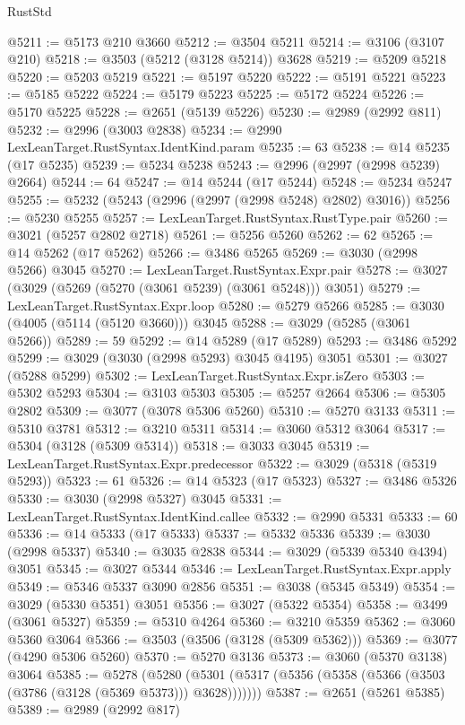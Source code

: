 \begin{lexlean}{RustStd}
\begin{coremodule}
@5211 := @5173 @210 @3660
@5212 := @3504 @5211
@5214 := @3106 (@3107 @210)
@5218 := @3503 (@5212 (@3128 @5214)) @3628
@5219 := @5209 @5218
@5220 := @5203 @5219
@5221 := @5197 @5220
@5222 := @5191 @5221
@5223 := @5185 @5222
@5224 := @5179 @5223
@5225 := @5172 @5224
@5226 := @5170 @5225
@5228 := @2651 (@5139 @5226)
@5230 := @2989 (@2992 @811)
@5232 := @2996 (@3003 @2838)
@5234 := @2990 LexLeanTarget.RustSyntax.IdentKind.param
@5235 := 63
@5238 := @14 @5235 (@17 @5235)
@5239 := @5234 @5238
@5243 := @2996 (@2997 (@2998 @5239) @2664)
@5244 := 64
@5247 := @14 @5244 (@17 @5244)
@5248 := @5234 @5247
@5255 := @5232 (@5243 (@2996 (@2997 (@2998 @5248) @2802) @3016))
@5256 := @5230 @5255
@5257 := LexLeanTarget.RustSyntax.RustType.pair
@5260 := @3021 (@5257 @2802 @2718)
@5261 := @5256 @5260
@5262 := 62
@5265 := @14 @5262 (@17 @5262)
@5266 := @3486 @5265
@5269 := @3030 (@2998 @5266) @3045
@5270 := LexLeanTarget.RustSyntax.Expr.pair
@5278 := @3027 (@3029 (@5269 (@5270 (@3061 @5239) (@3061 @5248))) @3051)
@5279 := LexLeanTarget.RustSyntax.Expr.loop
@5280 := @5279 @5266
@5285 := @3030 (@4005 (@5114 (@5120 @3660))) @3045
@5288 := @3029 (@5285 (@3061 @5266))
@5289 := 59
@5292 := @14 @5289 (@17 @5289)
@5293 := @3486 @5292
@5299 := @3029 (@3030 (@2998 @5293) @3045 @4195) @3051
@5301 := @3027 (@5288 @5299)
@5302 := LexLeanTarget.RustSyntax.Expr.isZero
@5303 := @5302 @5293
@5304 := @3103 @5303
@5305 := @5257 @2664
@5306 := @5305 @2802
@5309 := @3077 (@3078 @5306 @5260)
@5310 := @5270 @3133
@5311 := @5310 @3781
@5312 := @3210 @5311
@5314 := @3060 @5312 @3064
@5317 := @5304 (@3128 (@5309 @5314))
@5318 := @3033 @3045
@5319 := LexLeanTarget.RustSyntax.Expr.predecessor
@5322 := @3029 (@5318 (@5319 @5293))
@5323 := 61
@5326 := @14 @5323 (@17 @5323)
@5327 := @3486 @5326
@5330 := @3030 (@2998 @5327) @3045
@5331 := LexLeanTarget.RustSyntax.IdentKind.callee
@5332 := @2990 @5331
@5333 := 60
@5336 := @14 @5333 (@17 @5333)
@5337 := @5332 @5336
@5339 := @3030 (@2998 @5337)
@5340 := @3035 @2838
@5344 := @3029 (@5339 @5340 @4394) @3051
@5345 := @3027 @5344
@5346 := LexLeanTarget.RustSyntax.Expr.apply
@5349 := @5346 @5337 @3090 @2856
@5351 := @3038 (@5345 @5349)
@5354 := @3029 (@5330 @5351) @3051
@5356 := @3027 (@5322 @5354)
@5358 := @3499 (@3061 @5327)
@5359 := @5310 @4264
@5360 := @3210 @5359
@5362 := @3060 @5360 @3064
@5366 := @3503 (@3506 (@3128 (@5309 @5362)))
@5369 := @3077 (@4290 @5306 @5260)
@5370 := @5270 @3136
@5373 := @3060 (@5370 @3138) @3064
@5385 := @5278
    (@5280 (@5301 (@5317 (@5356 (@5358 (@5366 (@3503 (@3786 (@3128 (@5369 @5373))) @3628)))))))
@5387 := @2651 (@5261 @5385)
@5389 := @2989 (@2992 @817)

\end{coremodule}
\end{lexlean}
